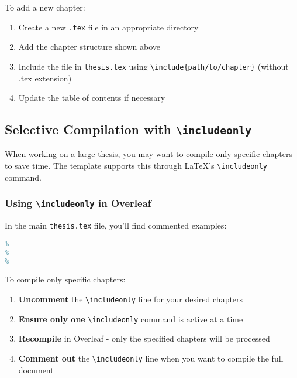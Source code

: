 To add a new chapter:

\begin{enumerate}
    \item Create a new \texttt{.tex} file in an appropriate directory
    \item Add the chapter structure shown above
    \item Include the file in \texttt{thesis.tex} using \texttt{\textbackslash include\{path/to/chapter\}} (without .tex extension)
    \item Update the table of contents if necessary
\end{enumerate}

\subsection{Selective Compilation with \texttt{\textbackslash includeonly}}
\label{sect:includeonly}

When working on a large thesis, you may want to compile only specific chapters to save time. The template supports this through LaTeX's \texttt{\textbackslash includeonly} command.

\subsubsection{Using \texttt{\textbackslash includeonly} in Overleaf}

In the main \texttt{thesis.tex} file, you'll find commented examples:

\begin{lstlisting}[language=TeX,caption={includeonly examples in thesis.tex}]
%
% 
% 
% 
\end{lstlisting}

To compile only specific chapters:

\begin{enumerate}
    \item \textbf{Uncomment} the \texttt{\textbackslash includeonly} line for your desired chapters
    \item \textbf{Ensure only one} \texttt{\textbackslash includeonly} command is active at a time
    \item \textbf{Recompile} in Overleaf - only the specified chapters will be processed
    \item \textbf{Comment out} the \texttt{\textbackslash includeonly} line when you want to compile the full document
\end{enumerate}

